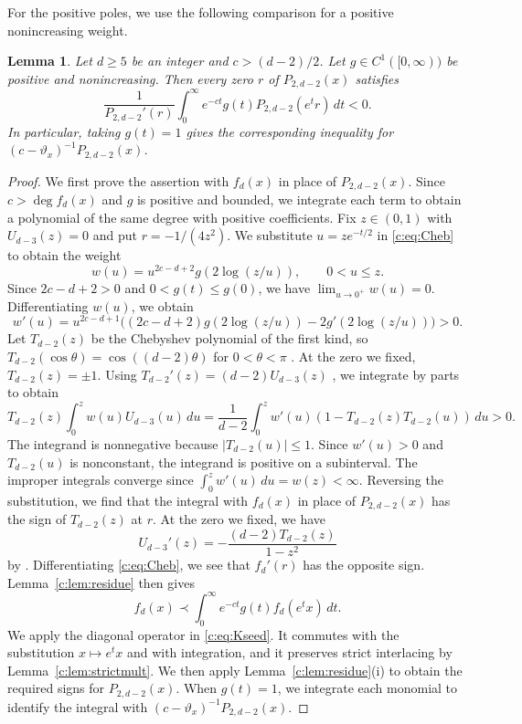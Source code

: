 \documentclass[11pt]{article}
\numberwithin{equation}{section}
\newtheorem{lemma}[theorem]{Lemma}
\theoremstyle{remark}\newtheorem{remark}[theorem]{Remark}
\newcommand{\varthetax}{\vartheta_x}
\begin{document}
For the positive poles, we use the following comparison for a positive
nonincreasing weight.
\begin{lemma}\label{c:lem:right}
Let $d\ge5$ be an integer and $c>(d-2)/2$. Let
$g\in C^1([0,\infty))$ be positive and
nonincreasing. Then every zero $r$ of $P_{2,d-2}(x)$ satisfies
\[
 \frac{1}{P_{2,d-2}'(r)}\int_0^\infty e^{-ct}g(t)P_{2,d-2}(e^t r)\,dt<0.
\]
In particular, taking $g(t)=1$ gives the corresponding inequality for
$(c-\varthetax)^{-1}P_{2,d-2}(x)$.
\end{lemma}
\begin{proof}
We first prove the assertion with $f_d(x)$ in place of $P_{2,d-2}(x)$.
Since $c>\deg f_d(x)$ and $g$ is positive and bounded, we integrate each
term to obtain a polynomial of the same degree with positive coefficients.
Fix $z\in(0,1)$ with $U_{d-3}(z)=0$ and put $r=-1/(4z^2)$.
We substitute $u=ze^{-t/2}$ in \eqref{c:eq:Cheb} to obtain the weight
\[
 w(u)=u^{2c-d+2}g(2\log(z/u)),\qquad 0<u\le z.
\]
Since $2c-d+2>0$ and $0<g(t)\le g(0)$, we have
$\lim_{u\to0^+}w(u)=0$.
Differentiating $w(u)$, we obtain
\[
 w'(u)=u^{2c-d+1}\bigl((2c-d+2)g(2\log(z/u))-2g'(2\log(z/u))\bigr)>0.
\]
Let $T_{d-2}(z)$ be the Chebyshev polynomial of the first kind, so
$T_{d-2}(\cos\theta)=\cos((d-2)\theta)$ for $0<\theta<\pi$
\cite[Eq.~(18.5.1)]{DLMF}. At the zero we fixed, $T_{d-2}(z)=\pm1$.
Using $T_{d-2}'(z)=(d-2)U_{d-3}(z)$ \cite[Eq.~(18.9.21)]{DLMF},
we integrate by parts to obtain
\[
 T_{d-2}(z)\int_0^z w(u)U_{d-3}(u)\,du
 =\frac1{d-2}\int_0^z w'(u)
       (1-T_{d-2}(z)T_{d-2}(u))\,du>0.
\]
The integrand is nonnegative because $|T_{d-2}(u)|\le1$.
Since $w'(u)>0$ and $T_{d-2}(u)$ is nonconstant, the integrand is
positive on a subinterval. The improper integrals converge since
$\int_0^z w'(u)\,du=w(z)<\infty$.
Reversing the substitution, we find that the
integral with $f_d(x)$ in place of $P_{2,d-2}(x)$ has the sign of $T_{d-2}(z)$
at $r$. At the zero we fixed, we have
\[
 U_{d-3}'(z)=-\frac{(d-2)T_{d-2}(z)}{1-z^2}
\]
by \cite[Eq.~(18.9.22)]{DLMF}. Differentiating \eqref{c:eq:Cheb},
we see that $f_d'(r)$ has the opposite sign.
Lemma~\ref{c:lem:residue} then gives
\[
 f_d(x)\prec\int_0^\infty e^{-ct}g(t)f_d(e^t x)\,dt.
\]
We apply the diagonal operator in \eqref{c:eq:Kseed}. It commutes with
the substitution $x\mapsto e^t x$ and with integration, and it preserves
strict interlacing by Lemma~\ref{c:lem:strictmult}.
We then apply Lemma~\ref{c:lem:residue}(i) to obtain
the required signs for $P_{2,d-2}(x)$. When $g(t)=1$, we integrate each monomial to identify
the integral with $(c-\varthetax)^{-1}P_{2,d-2}(x)$.
\end{proof}
\end{document}
